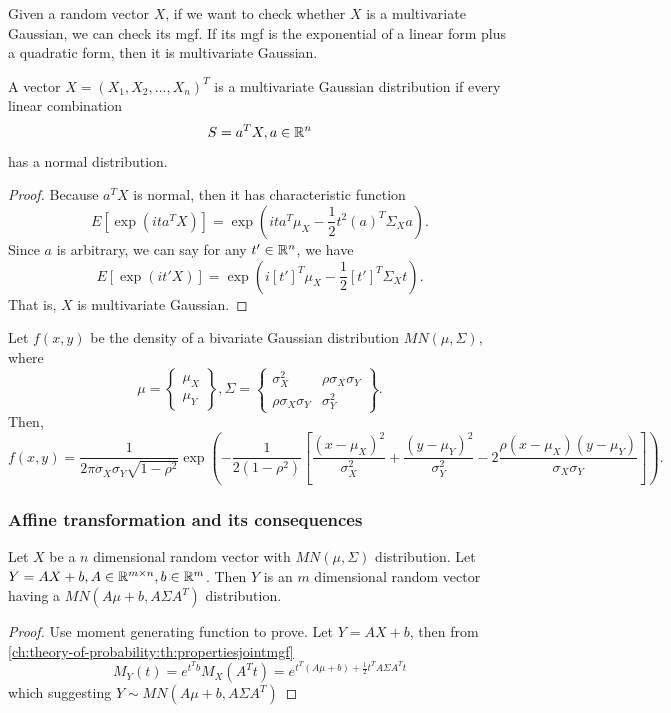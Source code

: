 \begin{refsection}
\begin{remark}[implication]
Given a random vector $X$, if we want to check whether $X$ is a multivariate Gaussian, we can check its mgf. If its mgf is the exponential of a linear form plus a quadratic form, then it is multivariate Gaussian. 	
\end{remark}

\begin{lemma}\label{ch:theory-of-statistics:th:MultivariateGaussianDefinitionViaLinearCombination}
A vector $X = (X_1,X_2,...,X_n)^T$ is a multivariate Gaussian distribution if every linear combination 
$$S = a^T X, a\in \mathbb{R}^n$$
has a normal distribution.
\end{lemma}
\begin{proof}
Because $a^TX$ is normal, then it has characteristic function 
$$E[\exp(i ta^TX)] = \exp(ita^T\mu_X - \frac{1}{2}t^2(a)^T\Sigma_X a).$$
Since $a$ is arbitrary, we can say for any $t'\in \mathbb{R}^n$, we have
$$E[\exp(i t'X)] = \exp(i[t']^T\mu_X - \frac{1}{2}[t']^T\Sigma_X t).$$
That is, $X$ is multivariate Gaussian. 
\end{proof}


\begin{example}\hfill
Let $f(x,y)$ be the density of a bivariate Gaussian distribution $MN(\mu,\Sigma)$, where
$$\mu = \begin{Bmatrix}
\mu_X\\
\mu_Y
\end{Bmatrix}, \Sigma = \begin{Bmatrix}
\sigma_X^2 & \rho \sigma_X\sigma_Y \\
\rho \sigma_X\sigma_Y & \sigma_Y^2
\end{Bmatrix}.$$
Then,
$$f(x,y) = \frac{1}{2\pi \sigma_X\sigma_Y\sqrt{1-\rho^2}}\exp(-\frac{1}{2(1-\rho^2)}[\frac{(x-\mu_X)^2}{\sigma_X^2}+\frac{(y-\mu_Y)^2}{\sigma_Y^2}-2\frac{\rho(x-\mu_X)(y-\mu_Y)}{\sigma_X\sigma_Y}]).$$	
\end{example}

\subsubsection{Affine transformation and its consequences}
\begin{theorem}\cite[183]{hoggintroduction}\label{ch:theory-of-statistics:th:affinetransformmultivariatenormal}
	Let $X$ be a $n$ dimensional random vector with $MN(\mu,\Sigma)$ distribution. Let $Y = AX + b, A\in \mathbb{R}^{m\times n}, b\in \mathbb{R}^m$. Then $Y$ is an $m$ dimensional random vector having a $MN(A\mu + b, A\Sigma A^T)$ distribution. 
\end{theorem}
\begin{proof}
	Use moment generating function to prove. Let $Y = AX + b$, then from \autoref{ch:theory-of-probability:th:propertiesjointmgf} 
	$$M_Y(t) = e^{t^T b}M_X(A^Tt) = e^{t^T(A\mu + b)+ \frac{1}{2}t^T A\Sigma A^T t}$$
	which suggesting $Y\sim MN(A\mu + b, A\Sigma A^T)$
\end{proof}


\end{refsection}
